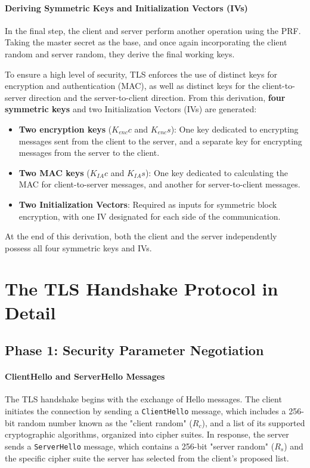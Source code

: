 \paragraph{Deriving Symmetric Keys and Initialization Vectors (IVs)}
In the final step, the client and server perform another operation using the PRF. Taking the master secret as the base, and once again incorporating the client random and server random, they derive the final working keys.

To ensure a high level of security, TLS enforces the use of distinct keys for encryption and authentication (MAC), as well as distinct keys for the client-to-server direction and the server-to-client direction. From this derivation, \textbf{four symmetric keys} and two Initialization Vectors (IVs) are generated:
\begin{itemize}
    \item \textbf{Two encryption keys} ($K_{enc}c$ and $K_{enc}s$): One key dedicated to encrypting messages sent from the client to the server, and a separate key for encrypting messages from the server to the client.
    \item \textbf{Two MAC keys} ($K_{IA}c$ and $K_{IA}s$): One key dedicated to calculating the MAC for client-to-server messages, and another for server-to-client messages.
    \item \textbf{Two Initialization Vectors}: Required as inputs for symmetric block encryption, with one IV designated for each side of the communication.
\end{itemize}

At the end of this derivation, both the client and the server independently possess all four symmetric keys and IVs.



\section{The TLS Handshake Protocol in Detail}

\subsection{Phase 1: Security Parameter Negotiation}

\paragraph{ClientHello and ServerHello Messages}
The TLS handshake begins with the exchange of Hello messages. The client initiates the connection by sending a \texttt{ClientHello} message, which includes a 256-bit random number known as the "client random" ($R_c$), and a list of its supported cryptographic algorithms, organized into cipher suites. In response, the server sends a \texttt{ServerHello} message, which contains a 256-bit "server random" ($R_s$) and the specific cipher suite the server has selected from the client's proposed list.

